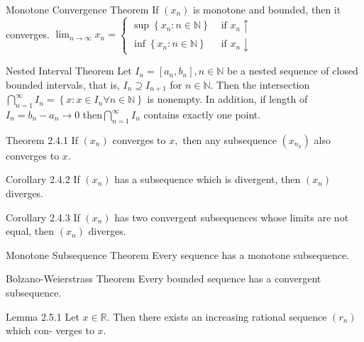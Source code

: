 \documentclass[10pt,landscape]{article}
\theoremstyle{definition}
\newcommand{\thistheoremname}{}
\newtheorem*{genericthm*}{\thistheoremname}
\newenvironment{namedthm*}[1]
{\renewcommand{\thistheoremname}{#1}\begin{genericthm*}}
{\end{genericthm*}}
\begin{document}
\begin{multicols}{3}
	\begin{namedthm*}{Monotone Convergence Theorem}
		If \(\left(x_{n}\right)\) is monotone and bounded, then it converges. \(\lim _{n \rightarrow \infty} x_{n}=\left\{\begin{array}{ll}{\sup \left\{x_{n}: n \in \mathbb{N}\right\}} & {\text { if } x_{n} \uparrow} \\ {\inf \left\{x_{n}: n \in \mathbb{N}\right\}} & {\text { if } x_{n} \downarrow}\end{array}\right.\)
	\end{namedthm*}

	\begin{namedthm*}{Nested Interval Theorem}
		Let \(I_{n}=\left[a_{n}, b_{n}\right], n \in \mathbb{N}\) be a nested sequence of closed bounded intervals, that is, \(I_{n} \supseteq I_{n+1}\)
		for \(n \in \mathbb{N} .\) Then the intersection \(\bigcap_{n=1}^{\infty} I_{n}=\left\{x: x \in I_{n} \forall n \in \mathbb{N}\right\}\) is nonempty. In addition, if length of \(I_{n}=b_{n}-a_{n} \rightarrow 0\) then\(\bigcap_{n=1}^{\infty} I_{n}\) contains exactly one point.
	\end{namedthm*}

	\begin{namedthm*}{Theorem 2.4.1}
		If \(\left(x_{n}\right)\) converges to \(x,\) then any subsequence \(\left(x_{n_{k}}\right)\) also converges to \(x\).
	\end{namedthm*}

	\begin{namedthm*}{Corollary 2.4.2}
		If \(\left(x_{n}\right)\) has a subsequence which is divergent, then \(\left(x_{n}\right)\) diverges.
	\end{namedthm*}

	\begin{namedthm*}{Corollary 2.4.3}
		If \(\left(x_{n}\right)\) has two convergent subsequences whose limits are not equal, then
		\(\left(x_{n}\right)\) diverges.
	\end{namedthm*}

	\begin{namedthm*}{Monotone Subsequence Theorem}
		Every sequence has a monotone subsequence.
	\end{namedthm*}

	\begin{namedthm*}{Bolzano-Weierstrass Theorem}
		Every bounded sequence has a convergent subsequence.
	\end{namedthm*}

	\begin{namedthm*}{Lemma 2.5.1}
		Let \(x \in \mathbb{R} .\) Then there exists an increasing rational sequence \(\left(r_{n}\right)\) which con-
		verges to \(x .\)
	\end{namedthm*}


\end{multicols}
\end{document}

